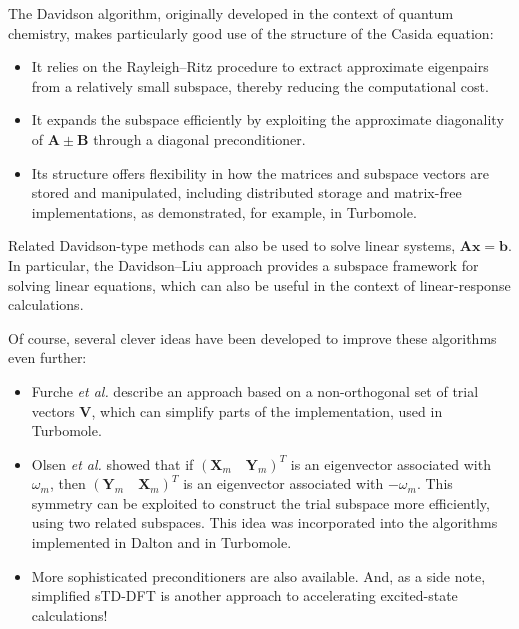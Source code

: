 \documentclass[10pt,aspectratio=169]{beamer}
\begin{document}
\begin{frame}
	The Davidson algorithm, originally developed in the context of quantum chemistry, makes particularly good use of the structure of the Casida equation:
	\begin{itemize}
		\item It relies on the Rayleigh--Ritz procedure to extract approximate eigenpairs from a relatively small subspace, thereby reducing the computational cost.
		\item It expands the subspace efficiently by exploiting the approximate diagonality of $\mathbf A\pm\mathbf B$ through a diagonal preconditioner.
		\item Its structure offers flexibility in how the matrices and subspace vectors are stored and manipulated, including distributed storage and matrix-free implementations, as demonstrated, for example, in Turbomole.
	\end{itemize}
	
	\medskip
	Related Davidson-type methods can also be used to solve linear systems, $\mathbf A\mathbf x=\mathbf b$. In particular, the Davidson--Liu approach provides a subspace framework for solving linear equations, which can also be useful in the context of linear-response calculations.
\end{frame}

\begin{frame}
	Of course, several clever ideas have been developed to improve these algorithms even further:
	\begin{itemize}
		\item Furche \textit{et al.} describe an approach based on a non-orthogonal set of trial vectors $\mathbf V$, which can simplify parts of the implementation, used in Turbomole.
		
		\item Olsen \textit{et al.} showed that if $(\mathbf X_m\quad \mathbf Y_m)^T$ is an eigenvector associated with $\omega_m$, then $(\mathbf Y_m\quad \mathbf X_m)^T$ is an eigenvector associated with $-\omega_m$.
		This symmetry can be exploited to construct the trial subspace more efficiently, using two related subspaces.
		This idea was incorporated into the algorithms implemented in Dalton and in Turbomole.
		
		\item More sophisticated preconditioners are also available.
		And, as a side note, simplified sTD-DFT is another approach to accelerating excited-state calculations!
	\end{itemize}
\end{frame}
\end{document}
